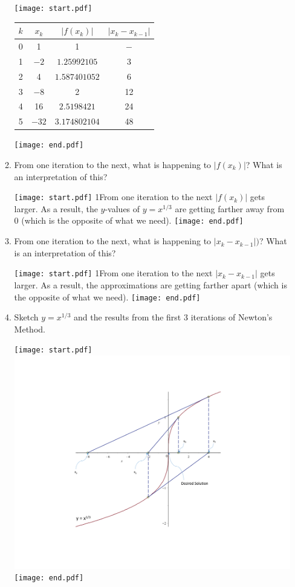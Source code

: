 \documentclass[12pt]{article}
\begin{document}
\begin{enumerate}
\begin{enumerate}
\texttt{[image: start.pdf]}
{{
\begin{tabular}{|c|c|c|c|}
\hline
$k$ & $x_k$ & $|f(x_k)|$ & $|x_k-x_{k-1}|$\\
\hline
0 & 1 & 1 & $-$\\
\hline
1 & $-2$ & $1.25992105$ & 3\\
\hline
2 &4&$1.587401052$&6\\
\hline
3& $-8$ &2 &12\\
\hline
4&16& $2.5198421$ &24\\
\hline
5	&$-32$&$3.174802104$&48\\
\hline
\end{tabular}
}}
\texttt{[image: end.pdf]}



\item From one iteration to the next, what is happening to $|f(x_k)|$?  What is an interpretation of this?

\texttt{[image: start.pdf]}
{{{1\linewidth}{From one iteration to the next $|f(x_k)|$ gets larger.  As a result, the $y$-values of $y=x^{1/3}$ are getting farther away from 0 (which is the opposite of what we need).}}}
\texttt{[image: end.pdf]}


\item From one iteration to the next, what is happening to $|x_k-x_{k-1}|)$?  What is an interpretation of this?

\texttt{[image: start.pdf]}
{{{1\linewidth}{From one iteration to the next $|x_k-x_{k-1}|$ gets larger.  As a result, the approximations are getting farther apart (which is the opposite of what we need).}}}
\texttt{[image: end.pdf]}


\item Sketch $y=x^{1/3}$ and the results from the first 3 iterations of Newton's Method.

\texttt{[image: start.pdf]}
{{\includegraphics[scale=0.5]{newton_fail.pdf}}}
\texttt{[image: end.pdf]}



\end{enumerate}
\end{enumerate}
\end{document}
